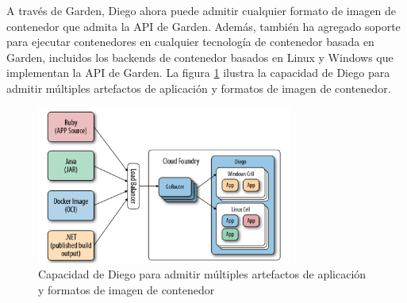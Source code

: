 \documentclass[a4paper,11pt]{article}
\begin{document}
A través de Garden, Diego ahora puede admitir cualquier formato de imagen de contenedor que admita la API de Garden. Además, también ha agregado soporte para ejecutar contenedores en cualquier tecnología de contenedor basada en Garden, incluidos los backends de contenedor basados en Linux y Windows que implementan la API de Garden. La figura \ref{fig:capacidadDiego} ilustra la capacidad de Diego para admitir múltiples artefactos de aplicación y formatos de imagen de contenedor.

\begin{figure}[H]
    \centering
    \includegraphics[width=0.75\textwidth]{aurora1.png}
    \caption{Capacidad de Diego para admitir múltiples artefactos de aplicación y formatos de imagen de contenedor}
    \label{fig:capacidadDiego}
\end{figure}
\end{document}
